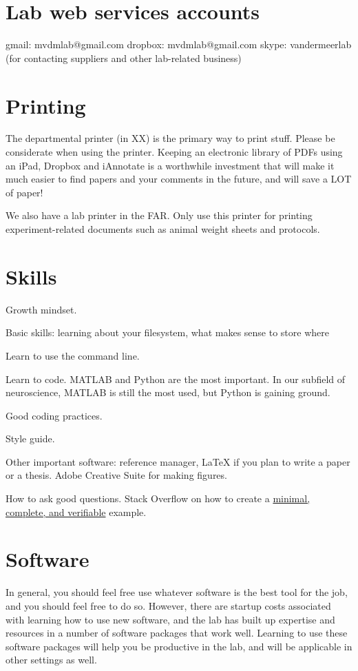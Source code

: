\documentclass{tufte-book}
\begin{document}
\section{Lab web services accounts}

gmail: mvdmlab@gmail.com
dropbox: mvdmlab@gmail.com
skype: vandermeerlab (for contacting suppliers and other lab-related business)

\section{Printing}

The departmental printer (in XX) is the primary way to print
stuff. Please be considerate when using the printer. Keeping an
electronic library of PDFs using an iPad, Dropbox and iAnnotate is a
worthwhile investment that will make it much easier to find papers and
your comments in the future, and will save a LOT of paper!

We also have a lab printer in the FAR. Only use this printer for
printing experiment-related documents such as animal weight sheets and
protocols.

\section{Skills}

Growth mindset.

Basic skills: learning about your filesystem, what makes sense to
store where

Learn to use the command line.

Learn to code. MATLAB and Python are the most important. In our
subfield of neuroscience, MATLAB is still the most used, but Python is
gaining ground.

Good coding practices.

Style guide.

Other important software: reference manager, LaTeX if you plan to
write a paper or a thesis. Adobe Creative Suite for making figures.

How to ask good questions. Stack Overflow on how to create a
\href{https://stackoverflow.com/help/mcve}{minimal, complete, and
  verifiable} example.

\section{Software}

In general, you should feel free use whatever software is the best
tool for the job, and you should feel free to do so. However, there are
startup costs associated with learning how to use new software, and
the lab has built up expertise and resources in a number of software
packages that work well. Learning to use these software packages will
help you be productive in the lab, and will be applicable in other
settings as well.
\end{document}
